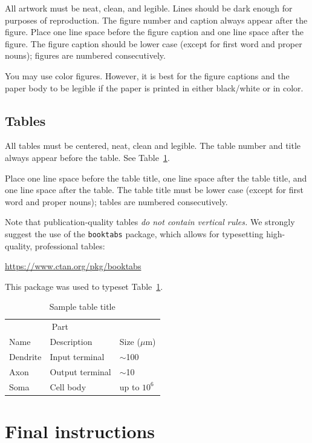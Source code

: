 \documentclass{article}
\begin{document}
All artwork must be neat, clean, and legible. Lines should be dark enough for
purposes of reproduction. The figure number and caption always appear after the
figure. Place one line space before the figure caption and one line space after
the figure. The figure caption should be lower case (except for first word and
proper nouns); figures are numbered consecutively.

You may use color figures.  However, it is best for the figure captions and the
paper body to be legible if the paper is printed in either black/white or in
color.

\subsection{Tables}

All tables must be centered, neat, clean and legible.  The table number and
title always appear before the table.  See Table~\ref{sample-table}.

Place one line space before the table title, one line space after the
table title, and one line space after the table. The table title must
be lower case (except for first word and proper nouns); tables are
numbered consecutively.

Note that publication-quality tables \emph{do not contain vertical rules.} We
strongly suggest the use of the \verb+booktabs+ package, which allows for
typesetting high-quality, professional tables:
\begin{center}
  \url{https://www.ctan.org/pkg/booktabs}
\end{center}
This package was used to typeset Table~\ref{sample-table}.

\begin{table}
  \caption{Sample table title}
  \label{sample-table}
  \centering
  \begin{tabular}{lll}
    \toprule
    \multicolumn{2}{c}{Part}                   \\
    \cmidrule(r){1-2}
    Name     & Description     & Size ($\mu$m) \\
    \midrule
    Dendrite & Input terminal  & $\sim$100     \\
    Axon     & Output terminal & $\sim$10      \\
    Soma     & Cell body       & up to $10^6$  \\
    \bottomrule
  \end{tabular}
\end{table}

\section{Final instructions}
\end{document}
